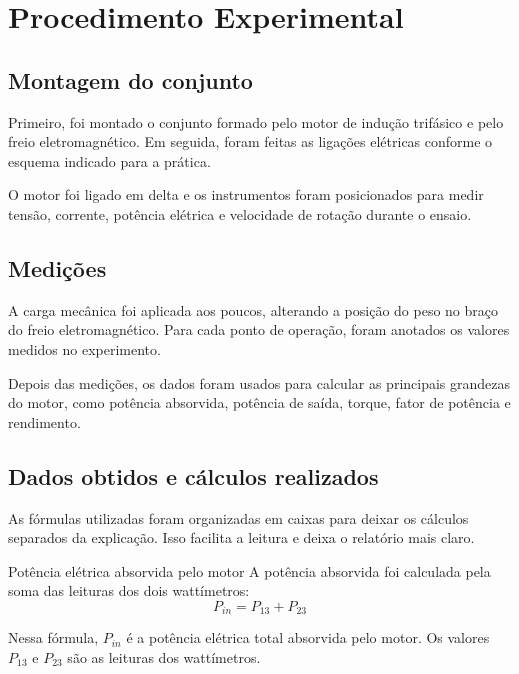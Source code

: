 \documentclass[12pt,a4paper]{article}
\begin{document}
\section{Procedimento Experimental}

\subsection{Montagem do conjunto}

Primeiro, foi montado o conjunto formado pelo motor de indução trifásico e pelo freio eletromagnético. Em seguida, foram feitas as ligações elétricas conforme o esquema indicado para a prática.

O motor foi ligado em delta e os instrumentos foram posicionados para medir tensão, corrente, potência elétrica e velocidade de rotação durante o ensaio.

\subsection{Medições}

A carga mecânica foi aplicada aos poucos, alterando a posição do peso no braço do freio eletromagnético. Para cada ponto de operação, foram anotados os valores medidos no experimento.

Depois das medições, os dados foram usados para calcular as principais grandezas do motor, como potência absorvida, potência de saída, torque, fator de potência e rendimento.

\subsection{Dados obtidos e cálculos realizados}

As fórmulas utilizadas foram organizadas em caixas para deixar os cálculos separados da explicação. Isso facilita a leitura e deixa o relatório mais claro.

\begin{caixacalculo}{Potência elétrica absorvida pelo motor}
A potência absorvida foi calculada pela soma das leituras dos dois wattímetros:
\begin{equation*}
P_{in}=P_{13}+P_{23}
\end{equation*}

Nessa fórmula, $P_{in}$ é a potência elétrica total absorvida pelo motor. Os valores $P_{13}$ e $P_{23}$ são as leituras dos wattímetros.
\end{caixacalculo}
\end{document}

